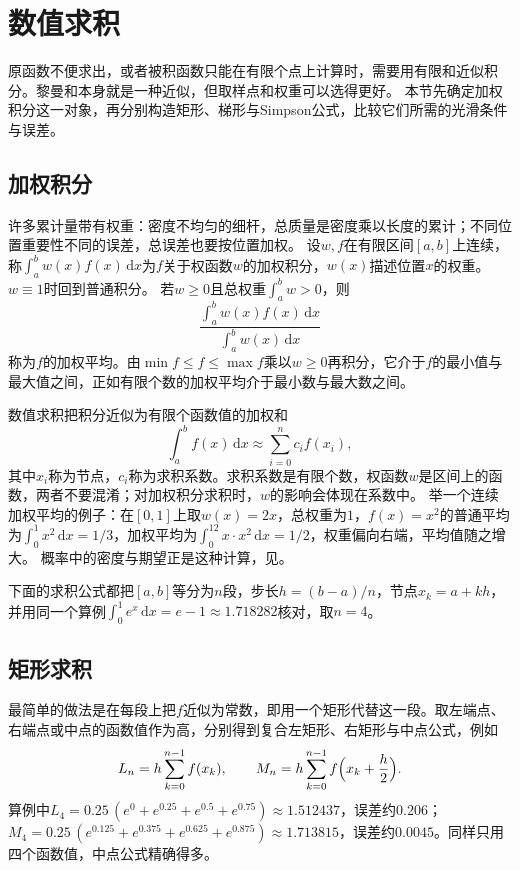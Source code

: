 \section{数值求积}
\label{sec:ru-numerical-quadrature}

原函数不便求出，或者被积函数只能在有限个点上计算时，需要用有限和近似积分。黎曼和本身就是一种近似，但取样点和权重可以选得更好。
本节先确定加权积分这一对象，再分别构造矩形、梯形与Simpson公式，比较它们所需的光滑条件与误差。

\subsection{加权积分}
\label{sec:ru-weighted-integrals}

许多累计量带有权重：密度不均匀的细杆，总质量是密度乘以长度的累计；不同位置重要性不同的误差，总误差也要按位置加权。
设$w,f$在有限区间$[a,b]$上连续，称$\int_a^bw(x)f(x)\,\mathrm dx$为$f$关于权函数$w$的加权积分，$w(x)$描述位置$x$的权重。$w\equiv1$时回到普通积分。
若$w\geq0$且总权重$\int_a^bw>0$，则
\[
 \frac{\int_a^bw(x)f(x)\,\mathrm dx}{\int_a^bw(x)\,\mathrm dx}
\]
称为$f$的加权平均。由$\min f\leq f\leq\max f$乘以$w\geq0$再积分，它介于$f$的最小值与最大值之间，正如有限个数的加权平均介于最小数与最大数之间。

数值求积把积分近似为有限个函数值的加权和
\[
 \int_a^bf(x)\,\mathrm dx\approx\sum_{i=0}^nc_if(x_i),
\]
其中$x_i$称为节点，$c_i$称为求积系数。求积系数是有限个数，权函数$w$是区间上的函数，两者不要混淆；对加权积分求积时，$w$的影响会体现在系数中。
举一个连续加权平均的例子：在$[0,1]$上取$w(x)=2x$，总权重为$1$，$f(x)=x^2$的普通平均为$\int_0^1x^2\,\mathrm dx=1/3$，加权平均为$\int_0^12x\cdot x^2\,\mathrm dx=1/2$，权重偏向右端，平均值随之增大。
概率中的密度与期望正是这种计算，见。

下面的求积公式都把$[a,b]$等分为$n$段，步长$h=(b-a)/n$，节点$x_k=a+kh$，并用同一个算例$\int_0^1e^x\,\mathrm dx=e-1\approx1.718282$核对，取$n=4$。

\subsection{矩形求积}
\label{sec:ru-rectangle-rule}

最简单的做法是在每段上把$f$近似为常数，即用一个矩形代替这一段。取左端点、右端点或中点的函数值作为高，分别得到复合左矩形、右矩形与中点公式，例如
\[
 L_n=h\sum_{k=0}^{n-1}f(x_k),\qquad M_n=h\sum_{k=0}^{n-1}f\Bigl(x_k+\frac h2\Bigr).
\]
算例中$L_4=0.25\,(e^0+e^{0.25}+e^{0.5}+e^{0.75})\approx1.512437$，误差约$0.206$；$M_4=0.25\,(e^{0.125}+e^{0.375}+e^{0.625}+e^{0.875})\approx1.713815$，误差约$0.0045$。同样只用四个函数值，中点公式精确得多。

